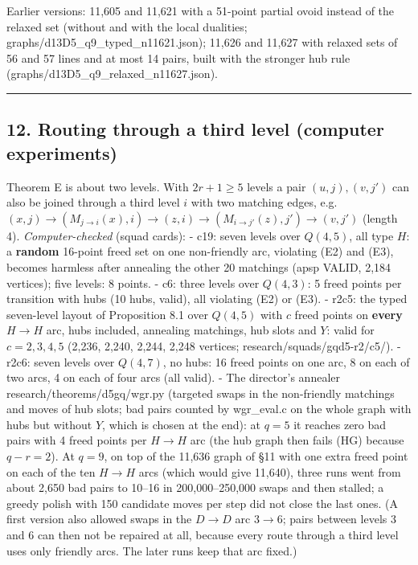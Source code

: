 \documentclass[
  11pt,
]{article}
\begin{document}
Earlier versions: 11,605 and 11,621 with a 51-point partial ovoid
instead of the relaxed set (without and with the local dualities;
graphs/d13D5\_q9\_typed\_n11621.json); 11,626 and 11,627 with relaxed
sets of 56 and 57 lines and at most 14 pairs, built with the stronger
hub rule (graphs/d13D5\_q9\_relaxed\_n11627.json).

\begin{center}\rule{0.5\linewidth}{0.5pt}\end{center}

\hypertarget{routing-through-a-third-level-computer-experiments}{%
\subsection{12. Routing through a third level (computer
experiments)}\label{routing-through-a-third-level-computer-experiments}}

Theorem E is about two levels. With \(2r+1\ge 5\) levels a pair
\((u,j),(v,j')\) can also be joined through a third level \(i\) with two
matching edges,
e.g.~\((x,j)\to(M_{j\to i}(x),i)\to(z,i)\to(M_{i\to j'}(z),j')\to(v,j')\)
(length 4). \emph{Computer-checked} (squad cards): - c19: seven levels
over \(Q(4,5)\), all type \(H\): a \textbf{random} 16-point freed set on
one non-friendly arc, violating (E2) and (E3), becomes harmless after
annealing the other 20 matchings (apsp VALID, 2,184 vertices); five
levels: 8 points. - c6: three levels over \(Q(4,3)\): 5 freed points per
transition with hubs (10 hubs, valid), all violating (E2) or (E3). -
r2c5: the typed seven-level layout of Proposition 8.1 over \(Q(4,5)\)
with \(c\) freed points on \textbf{every} \(H\to H\) arc, hubs included,
annealing matchings, hub slots and \(Y\): valid for \(c = 2,3,4,5\)
(2,236, 2,240, 2,244, 2,248 vertices; research/squads/gqd5-r2/c5/). -
r2c6: seven levels over \(Q(4,7)\), no hubs: 16 freed points on one arc,
8 on each of two arcs, 4 on each of four arcs (all valid). - The
director's annealer research/theorems/d5gq/wgr.py (targeted swaps in the
non-friendly matchings and moves of hub slots; bad pairs counted by
wgr\_eval.c on the whole graph with hubs but without \(Y\), which is
chosen at the end): at \(q = 5\) it reaches zero bad pairs with 4 freed
points per \(H\to H\) arc (the hub graph then fails (HG) because
\(q-r = 2\)). At \(q = 9\), on top of the 11,636 graph of §11 with one
extra freed point on each of the ten \(H\to H\) arcs (which would give
11,640), three runs went from about 2,650 bad pairs to 10--16 in
200,000--250,000 swaps and then stalled; a greedy polish with 150
candidate moves per step did not close the last ones. (A first version
also allowed swaps in the \(D\to D\) arc \(3\to6\); pairs between levels
3 and 6 can then not be repaired at all, because every route through a
third level uses only friendly arcs. The later runs keep that arc
fixed.)
\end{document}
